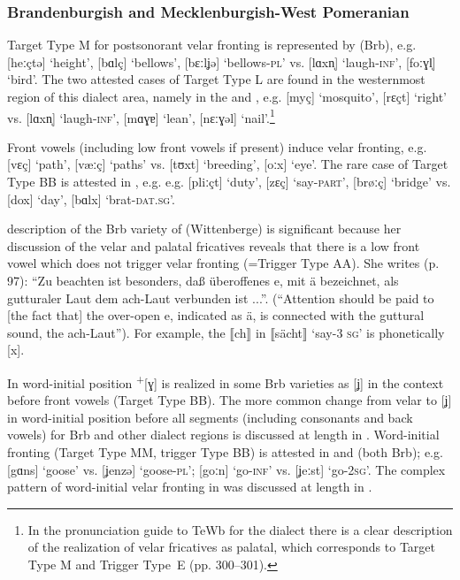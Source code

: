 \subsubsection{Brandenburgish and Mecklenburgish-West Pomeranian}
Target Type M for postsonorant velar fronting is represented by  (Brb), e.g. [heːçtə] ‘height’, [bɑlç] ‘bellows’, [bɛːlʝə] ‘bellows-\textsc{pl}’ vs. [lɑxn̩] ‘laugh\textsc{{}-inf}’, [foːɣl̩] ‘bird’. The two attested cases of Target Type L are found in the westernmost region of this dialect area, namely in the  and , e.g.  [myç] ‘mosquito’, [rɛçt] ‘right’ vs. [lɑxn̩] ‘laugh\textsc{{}-inf}’, [mɑɣɐ] ‘lean’, [nɛːɣəl] ‘nail’.\footnote{In the pronunciation guide to TeWb for the  dialect there is a clear description of the realization of velar fricatives as palatal, which corresponds to Target Type M and Trigger Type~E (pp. 300--301).}

Front vowels (including low front vowels if present) induce velar fronting, e.g.  [vɛç] ‘path’, [væːç] ‘paths’ vs. [tʊxt] ‘breeding’, [oːx] ‘eye’.  The rare case of Target Type BB is attested in , e.g. e.g. [pliːçt] ‘duty’, [zɛç] ‘say-\textsc{part}’, [brøːç] ‘bridge’ vs. [dox] ‘day’, [bɑlx] ‘brat-\textsc{dat}.\textsc{sg}’.

 description of the Brb variety of  (Wittenberge) is significant because her discussion of the velar and palatal fricatives reveals that there is a low front vowel which does not trigger velar fronting (=Trigger Type AA). She writes (p. 97): “Zu beachten ist besonders, daß überoffenes e, mit ä bezeichnet, als gutturaler Laut dem ach-Laut verbunden ist ...”. (“Attention should be paid to [the fact that] the over-open e, indicated as ä, is connected with the guttural sound, the ach-Laut”). For example, the ⟦ch⟧ in ⟦sächt⟧ ‘say-\textsc{3} \textsc{sg}’ is phonetically [x].

In word-initial position  \textsuperscript{+}[ɣ] is realized in some Brb varieties as [ʝ] in the context before front vowels  (Target Type BB). The more common change from velar to [ʝ] in word-initial position before all segments (including consonants and back vowels) for Brb and other dialect regions is discussed at length in . Word-initial fronting (Target Type MM, trigger Type BB) is attested in  and  (both Brb); e.g.  [gɑns] ‘goose’ vs. [ʝenzə] ‘goose-\textsc{pl}’;  [goːn] ‘go\textsc{{}-inf}’ vs. [ʝeːst] ‘go\textsc{{}-2sg}’. The complex pattern of word-initial velar fronting in  was discussed at length in . 

